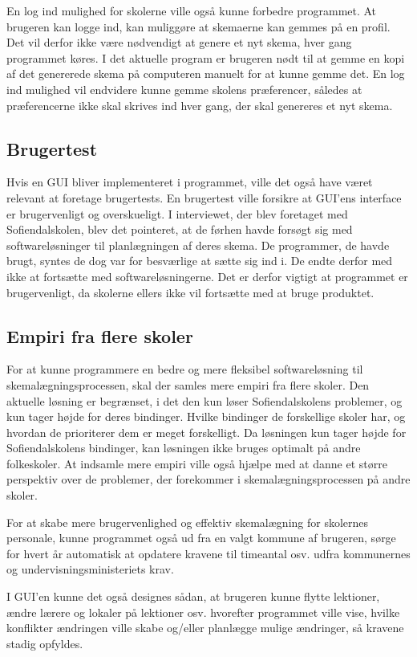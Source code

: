 En log ind mulighed for skolerne ville også kunne forbedre programmet. At brugeren kan logge ind, kan muliggøre at skemaerne kan gemmes på en profil. Det vil derfor ikke være nødvendigt at genere et nyt skema, hver gang programmet køres. I det aktuelle program er brugeren nødt til at gemme en kopi af det genererede skema på computeren manuelt for at kunne gemme det. En log ind mulighed vil endvidere kunne gemme skolens præferencer, således at præferencerne ikke skal skrives ind hver gang, der skal genereres et nyt skema.
 
\subsection{Brugertest}
Hvis en GUI bliver implementeret i programmet, ville det også have været relevant at foretage brugertests. En brugertest ville forsikre at GUI’ens interface er brugervenligt og overskueligt. I interviewet, der blev foretaget med Sofiendalskolen, blev det pointeret, at de førhen havde forsøgt sig med softwareløsninger til planlægningen af deres skema. De programmer, de havde brugt, syntes de dog var for besværlige at sætte sig ind i. De endte derfor med ikke at fortsætte med softwareløsningerne. Det er derfor vigtigt at programmet er brugervenligt, da skolerne ellers ikke vil fortsætte med at bruge produktet. 

\subsection{Empiri fra flere skoler}
For at kunne programmere en bedre og mere fleksibel softwareløsning til skemalægningsprocessen, skal der samles mere empiri fra flere skoler. Den aktuelle løsning er begrænset, i det den kun løser Sofiendalskolens problemer, og kun tager højde for deres bindinger. Hvilke bindinger de forskellige skoler har, og hvordan de prioriterer dem er meget forskelligt. Da løsningen kun tager højde for Sofiendalskolens bindinger, kan løsningen ikke bruges optimalt på andre folkeskoler. At indsamle mere empiri ville også hjælpe med at danne et større perspektiv over de problemer, der forekommer i skemalægningsprocessen på andre skoler. 

For at skabe mere brugervenlighed og effektiv skemalægning for skolernes personale, kunne programmet også ud fra en valgt kommune af brugeren, sørge for hvert år automatisk at opdatere kravene til timeantal osv. udfra kommunernes og undervisningsministeriets krav.

I GUI'en kunne det også designes sådan, at brugeren kunne flytte lektioner, ændre lærere og lokaler på lektioner osv. hvorefter programmet ville vise, hvilke konflikter ændringen ville skabe og/eller planlægge mulige ændringer, så kravene stadig opfyldes.